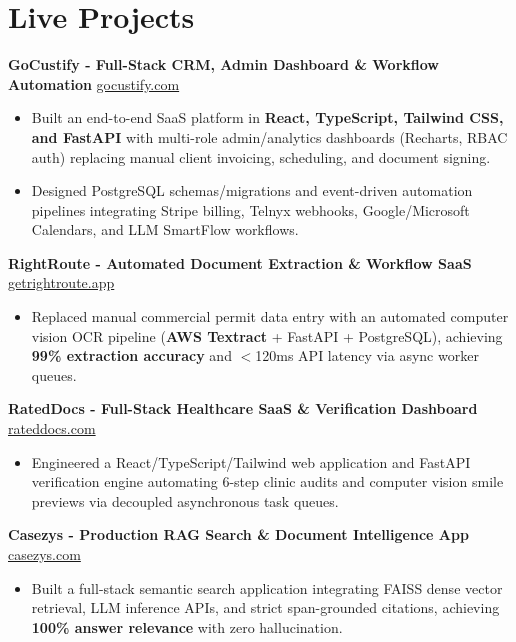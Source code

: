 \documentclass[9.5pt,a4paper]{article}
\begin{document}
\section*{Live Projects}
\noindent
\textbf{GoCustify - Full-Stack CRM, Admin Dashboard \& Workflow Automation} \hfill \href{https://gocustify.com}{gocustify.com}
\begin{itemize}
    \item Built an end-to-end SaaS platform in \textbf{React, TypeScript, Tailwind CSS, and FastAPI} with multi-role admin/analytics dashboards (Recharts, RBAC auth) replacing manual client invoicing, scheduling, and document signing.
    \item Designed PostgreSQL schemas/migrations and event-driven automation pipelines integrating Stripe billing, Telnyx webhooks, Google/Microsoft Calendars, and LLM SmartFlow workflows.
\end{itemize}
\vspace{0.6pt}
\noindent
\textbf{RightRoute - Automated Document Extraction \& Workflow SaaS} \hfill \href{https://getrightroute.app}{getrightroute.app}
\begin{itemize}
    \item Replaced manual commercial permit data entry with an automated computer vision OCR pipeline (\textbf{AWS Textract} + FastAPI + PostgreSQL), achieving \textbf{99\% extraction accuracy} and $<$120ms API latency via async worker queues.
\end{itemize}
\vspace{0.6pt}
\noindent
\textbf{RatedDocs - Full-Stack Healthcare SaaS \& Verification Dashboard} \hfill \href{https://rateddocs.com}{rateddocs.com}
\begin{itemize}
    \item Engineered a React/TypeScript/Tailwind web application and FastAPI verification engine automating 6-step clinic audits and computer vision smile previews via decoupled asynchronous task queues.
\end{itemize}
\vspace{0.6pt}
\noindent
\textbf{Casezys - Production RAG Search \& Document Intelligence App} \hfill \href{https://casezys.com}{casezys.com}
\begin{itemize}
    \item Built a full-stack semantic search application integrating FAISS dense vector retrieval, LLM inference APIs, and strict span-grounded citations, achieving \textbf{100\% answer relevance} with zero hallucination.
\end{itemize}
\vspace{0.6pt}
\end{document}
